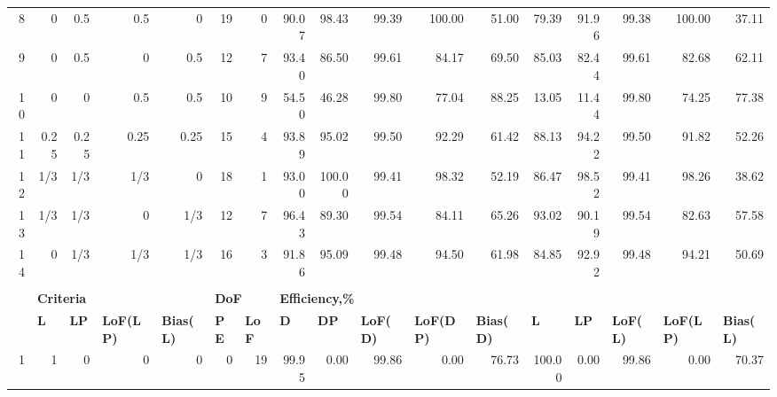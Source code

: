 \begin{landscape}
\begin{table}[p]
{\begin{tabular}{rrrrrrrrrrrrrrrrr}
8 & 0 & 0.5 & 0.5 & 0 & \multicolumn{1}{|r}{19} & 0 & \multicolumn{1}{|r}{90.07} & 98.43 & 99.39 & 100.00 & 51.00 & \multicolumn{1}{|r}{79.39} & 91.96 & 99.38 & 100.00 & 37.11 \\
9 & 0 & 0.5 & 0 & 0.5 & \multicolumn{1}{|r}{12} & 7 & \multicolumn{1}{|r}{93.40} & 86.50 & 99.61 & 84.17 & 69.50 & \multicolumn{1}{|r}{85.03} & 82.44 & 99.61 & 82.68 & 62.11 \\
10 & 0 & 0 & 0.5 & 0.5 & \multicolumn{1}{|r}{10} & 9 & \multicolumn{1}{|r}{54.50} & 46.28 & 99.80 & 77.04 & 88.25 & \multicolumn{1}{|r}{13.05} & 11.44 & 99.80 & 74.25 & 77.38 \\
11 & 0.25 & 0.25 & 0.25 & 0.25 & \multicolumn{1}{|r}{15} & 4 & \multicolumn{1}{|r}{93.89} & 95.02 & 99.50 & 92.29 & 61.42 & \multicolumn{1}{|r}{88.13} & 94.22 & 99.50 & 91.82 & 52.26 \\
12 & 1/3 & 1/3 & 1/3 & 0 & \multicolumn{1}{|r}{18} & 1 & \multicolumn{1}{|r}{93.00} & 100.00 & 99.41 & 98.32 & 52.19 & \multicolumn{1}{|r}{86.47} & 98.52 & 99.41 & 98.26 & 38.62 \\
13 & 1/3 & 1/3 & 0 & 1/3 & \multicolumn{1}{|r}{12} & 7 & \multicolumn{1}{|r}{96.43} & 89.30 & 99.54 & 84.11 & 65.26 & \multicolumn{1}{|r}{93.02} & 90.19 & 99.54 & 82.63 & 57.58 \\
14 & 0 & 1/3 & 1/3 & 1/3 & \multicolumn{1}{|r}{16} & 3 & \multicolumn{1}{|r}{91.86} & 95.09 & 99.48 & 94.50 & 61.98 & \multicolumn{1}{|r}{84.85} & 92.92 & 99.48 & 94.21 & 50.69 \\
 &  &  &  &  &  &  &  &  &  &  &  &  &  &  &  &  \\
 \multicolumn{1}{l}{} & \multicolumn{4}{l}{{\bf Criteria}} & \multicolumn{2}{l}{{\bf DoF}} & \multicolumn{10}{l}{{\bf Efficiency,\%}} \\
\multicolumn{1}{l}{} & \multicolumn{1}{l}{{\bf L}} & \multicolumn{1}{l}{{\bf LP}} & \multicolumn{1}{l}{{\bf LoF(LP)}} & \multicolumn{1}{l}{{\bf Bias(L)}} & \multicolumn{1}{l}{{\bf PE}} & \multicolumn{1}{l}{{\bf LoF}} & \multicolumn{1}{l}{{\bf D}} & \multicolumn{1}{l}{{\bf DP}} & \multicolumn{1}{l}{{\bf LoF(D)}} & \multicolumn{1}{l}{{\bf LoF(DP)}} & \multicolumn{1}{l}{{\bf Bias(D)}} & \multicolumn{1}{l}{{\bf L}} & \multicolumn{1}{l}{{\bf LP}} & \multicolumn{1}{l}{{\bf LoF(L)}} & \multicolumn{1}{l}{{\bf LoF(LP)}} & \multicolumn{1}{l}{{\bf Bias(L)}} \\
1 & 1 & 0 & 0 & 0 & \multicolumn{1}{|r}{0} & 19 & \multicolumn{1}{|r}{99.95} & 0.00 & 99.86 & 0.00 & 76.73 & \multicolumn{1}{|r}{100.00} & 0.00 & 99.86 & 0.00 & 70.37 \\

\end{tabular}}
\end{table}
\end{landscape}
